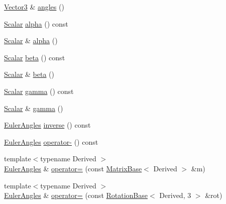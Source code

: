 \begin{DoxyCompactItemize}
\item 
\hyperlink{class_eigen_1_1_euler_angles_af0f446aa0f46b3439abedff63fabf39c}{Vector3} \& \hyperlink{class_eigen_1_1_euler_angles_afff76daa2d6a3165a1354c349366fb80}{angles} ()
\item 
\hyperlink{class_eigen_1_1_euler_angles_a2ab1d433ac9683268446f8905ac31aac}{Scalar} \hyperlink{class_eigen_1_1_euler_angles_a6146f78ee0fb9d9a7d685a4654066825}{alpha} () const
\item 
\hyperlink{class_eigen_1_1_euler_angles_a2ab1d433ac9683268446f8905ac31aac}{Scalar} \& \hyperlink{class_eigen_1_1_euler_angles_a69942a5a9b0c3670e7f2797e84cbde8c}{alpha} ()
\item 
\hyperlink{class_eigen_1_1_euler_angles_a2ab1d433ac9683268446f8905ac31aac}{Scalar} \hyperlink{class_eigen_1_1_euler_angles_a1bf59f8acaed985964c98c1f59d8f5ab}{beta} () const
\item 
\hyperlink{class_eigen_1_1_euler_angles_a2ab1d433ac9683268446f8905ac31aac}{Scalar} \& \hyperlink{class_eigen_1_1_euler_angles_a2db042cfba5486d46fdeb77fecd8e509}{beta} ()
\item 
\hyperlink{class_eigen_1_1_euler_angles_a2ab1d433ac9683268446f8905ac31aac}{Scalar} \hyperlink{class_eigen_1_1_euler_angles_aa75a5f16105d96eedf81bf9f8e789e21}{gamma} () const
\item 
\hyperlink{class_eigen_1_1_euler_angles_a2ab1d433ac9683268446f8905ac31aac}{Scalar} \& \hyperlink{class_eigen_1_1_euler_angles_a4c6216fa2fca4d5d70d8f44dae4cf88c}{gamma} ()
\item 
\hyperlink{class_eigen_1_1_euler_angles}{Euler\+Angles} \hyperlink{class_eigen_1_1_euler_angles_a1c37cedc590311d6ecaec7215d7c8f2c}{inverse} () const
\item 
\hyperlink{class_eigen_1_1_euler_angles}{Euler\+Angles} \hyperlink{class_eigen_1_1_euler_angles_a2a30e027e6f3fa275d7403c1c7e613af}{operator-\/} () const
\item 
{\footnotesize template$<$typename Derived $>$ }\\\hyperlink{class_eigen_1_1_euler_angles}{Euler\+Angles} \& \hyperlink{class_eigen_1_1_euler_angles_af11e32e3584251f0dce65811ac6ad3b4}{operator=} (const \hyperlink{group___core___module_class_eigen_1_1_matrix_base}{Matrix\+Base}$<$ Derived $>$ \&m)
\item 
{\footnotesize template$<$typename Derived $>$ }\\\hyperlink{class_eigen_1_1_euler_angles}{Euler\+Angles} \& \hyperlink{class_eigen_1_1_euler_angles_abc2256872ea7e285cb915b8af82b6810}{operator=} (const \hyperlink{class_eigen_1_1_rotation_base}{Rotation\+Base}$<$ Derived, 3 $>$ \&rot)

\end{DoxyCompactItemize}
